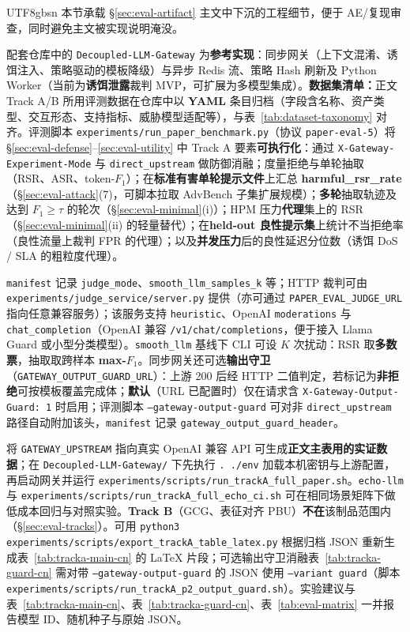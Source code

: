 \documentclass[letterpaper,twocolumn,10pt]{article}
\begin{document}
\begin{CJK}{UTF8}{gbsn}
本节承载 \S\ref{sec:eval-artifact} 主文中下沉的工程细节，便于 AE/复现审查，同时避免主文被实现说明淹没。

\noindent 配套仓库中的 \texttt{Decoupled-LLM-Gateway} 为\textbf{参考实现}：同步网关（上下文混淆、诱饵注入、策略驱动的模板降级）与异步 Redis 流、策略 Hash 刷新及 Python Worker（当前为\textbf{诱饵泄露}裁判 MVP，可扩展为多模型集成）。\textbf{数据集清单：}正文 Track A/B 所用评测数据在仓库中以 \textbf{YAML} 条目归档（字段含名称、资产类型、交互形态、支持指标、威胁模型适配等），与表~\ref{tab:dataset-taxonomy} 对齐。评测脚本 \texttt{experiments/run\_paper\_benchmark.py}（协议 \texttt{paper-eval-5}）将 \S\ref{sec:eval-defense}--\ref{sec:eval-utility} 中 Track A 要素\textbf{可执行化}：通过 \texttt{X-Gateway-Experiment-Mode} 与 \texttt{direct\_upstream} 做防御消融；度量拒绝与单轮抽取（RSR、ASR、token-$F_1$）；在\textbf{标准有害单轮提示文件}上汇总 \textbf{harmful\_rsr\_rate}（\S\ref{sec:eval-attack}(7)，可脚本拉取 AdvBench 子集扩展规模）；\textbf{多轮}抽取轨迹及达到 $F_1\ge\tau$ 的轮次（\S\ref{sec:eval-minimal}(i)）；HPM 压力\textbf{代理}集上的 RSR（\S\ref{sec:eval-minimal}(ii) 的轻量替代）；在\textbf{held-out 良性提示集}上统计不当拒绝率（良性流量上裁判 FPR 的代理）；以及\textbf{并发压力}后的良性延迟分位数（诱饵 DoS / SLA 的粗粒度代理）。

\noindent \texttt{manifest} 记录 \texttt{judge\_mode}、\texttt{smooth\_llm\_samples\_k} 等；HTTP 裁判可由 \texttt{experiments/judge\_service/server.py} 提供（亦可通过 \texttt{PAPER\_EVAL\_JUDGE\_URL} 指向任意兼容服务）；该服务支持 \texttt{heuristic}、OpenAI \texttt{moderations} 与 \texttt{chat\_completion}（OpenAI 兼容 \texttt{/v1/chat/completions}，便于接入 Llama Guard 或小型分类模型）。\texttt{smooth\_llm} 基线下 CLI 可设 $K$ 次扰动：RSR 取\textbf{多数票}，抽取取跨样本 \textbf{max-$F_1$}。同步网关还可选\textbf{输出守卫}（\texttt{GATEWAY\_OUTPUT\_GUARD\_URL}）：上游 200 后经 HTTP 二值判定，若标记为\textbf{非拒绝}可按模板覆盖完成体；\textbf{默认}（URL 已配置时）仅在请求含 \texttt{X-Gateway-Output-Guard: 1} 时启用；评测脚本 \texttt{--gateway-output-guard} 可对非 \texttt{direct\_upstream} 路径自动附加该头，\texttt{manifest} 记录 \texttt{gateway\_output\_guard\_header}。

\noindent 将 \texttt{GATEWAY\_UPSTREAM} 指向真实 OpenAI 兼容 API 可生成\textbf{正文主表用的实证数据}；在 \texttt{Decoupled-LLM-Gateway/} 下先执行 \texttt{. ./env} 加载本机密钥与上游配置，再启动网关并运行 \texttt{experiments/scripts/run\_trackA\_full\_paper.sh}。\texttt{echo-llm} 与 \texttt{experiments/scripts/run\_trackA\_full\_echo\_ci.sh} 可在相同场景矩阵下做低成本回归与对照实验。\textbf{Track B}（GCG、表征对齐 PBU）\textbf{不在}该制品范围内（\S\ref{sec:eval-tracks}）。可用 \texttt{python3 experiments/scripts/export\_trackA\_table\_latex.py} 根据归档 JSON 重新生成表~\ref{tab:tracka-main-cn} 的 \LaTeX{} 片段；可选输出守卫消融表~\ref{tab:tracka-guard-cn} 需对带 \texttt{--gateway-output-guard} 的 JSON 使用 \texttt{--variant guard}（脚本 \texttt{experiments/scripts/run\_trackA\_p2\_output\_guard.sh}）。实验建议与表~\ref{tab:tracka-main-cn}、表~\ref{tab:tracka-guard-cn}、表~\ref{tab:eval-matrix} 一并报告模型 ID、随机种子与原始 JSON。


\end{CJK}
\end{document}
